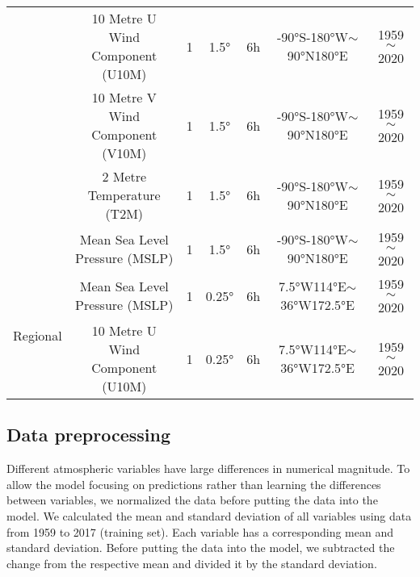 \begin{table*}[ht]
\begin{small}
\begin{sc}
\begin{tabular}{l|cccccc}
                        & 10 Metre U Wind Component (U10M)                         & 1      & 1.5°                                                         & 6h & -90°S-180°W$\sim$90°N180°E                              & 1959$\sim$2020 \\
                        & 10 Metre V Wind Component (V10M)                         & 1      & 1.5°                                                         & 6h & -90°S-180°W$\sim$90°N180°E                              & 1959$\sim$2020 \\
                        & 2 Metre Temperature (T2M)                                & 1      & 1.5°                                                         & 6h & -90°S-180°W$\sim$90°N180°E                              & 1959$\sim$2020 \\
                        & Mean Sea Level Pressure (MSLP)                          & 1      & 1.5°                                                         & 6h & -90°S-180°W$\sim$90°N180°E                              & 1959$\sim$2020 \\  \midrule
        \multirow{2}{*}{Regional}                & Mean Sea Level Pressure (MSLP)                          & 1      & 0.25°                                                        & 6h & 7.5°W114°E$\sim$ 36°W172.5°E                                                       & 1959$\sim$2020 \\
        & 10 Metre U Wind Component (U10M)                          & 1      & 0.25°                                                        & 6h & 7.5°W114°E$\sim$ 36°W172.5°E                                                        & 1959$\sim$2020 \\
        \bottomrule
        \end{tabular}
        \end{sc}
	\end{small}
    \label{tab:data}
    \end{table*}
\subsection{Data preprocessing}
    Different atmospheric variables have large differences in numerical magnitude. To allow the model focusing on predictions rather than learning the differences between variables, we normalized the data before putting the data into the model. We calculated the mean and standard deviation of all variables using data from 1959 to 2017 (training set). Each variable has a corresponding mean and standard deviation. Before putting the data into the model, we subtracted the change from the respective mean and divided it by the standard deviation.
    
